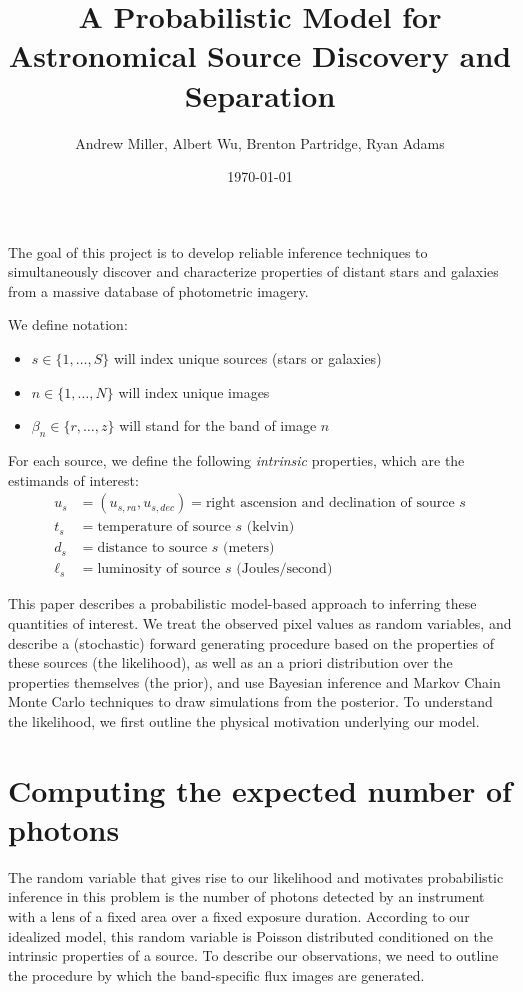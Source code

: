 \documentclass[11pt]{article}
\title{A Probabilistic Model for Astronomical Source Discovery and Separation}
\author{Andrew Miller, Albert Wu, Brenton Partridge, Ryan Adams}
\date{\today}
\begin{document}
\maketitle

The goal of this project is to develop reliable inference techniques to simultaneously discover and characterize properties of distant stars and galaxies from a massive database of photometric imagery.  

We define notation: 
\begin{itemize} \itemsep 0pt
\item $s \in \{1, \dots, S\}$ will index unique sources (stars or galaxies)
\item $n \in \{1, \dots, N\}$ will index unique images
\item $\beta_n \in \{r, \dots, z\}$ will stand for the band of image $n$
\end{itemize}

For each source, we define the following \emph{intrinsic} properties, which are the estimands of interest: 
\begin{align*}
  u_s &= (u_{s,ra}, u_{s,dec}) = \text{right ascension and declination of source $s$} \\
  t_s &= \text{temperature of source $s$ (kelvin)} \\
  d_s &= \text{distance to source $s$ (meters)} \\
  \ell_s &= \text{luminosity of source $s$ (Joules/second)} 
\end{align*}

This paper describes a probabilistic model-based approach to inferring these quantities of interest.  We treat the observed pixel values as random variables, and describe a (stochastic) forward generating procedure based on the properties of these sources (the likelihood), as well as an a priori distribution over the properties themselves (the prior), and use Bayesian inference and Markov Chain Monte Carlo techniques to draw simulations from the posterior.  To understand the likelihood, we first outline the physical motivation underlying our model.  

\section{Computing the expected number of photons}
The random variable that gives rise to our likelihood and motivates probabilistic inference in this problem is the number of photons detected by an instrument with a lens of a fixed area over a fixed exposure duration.  According to our idealized model, this random variable is Poisson distributed conditioned on the intrinsic properties of a source.  To describe our observations, we need to outline the procedure by which the band-specific flux images are generated.  
\end{document}
